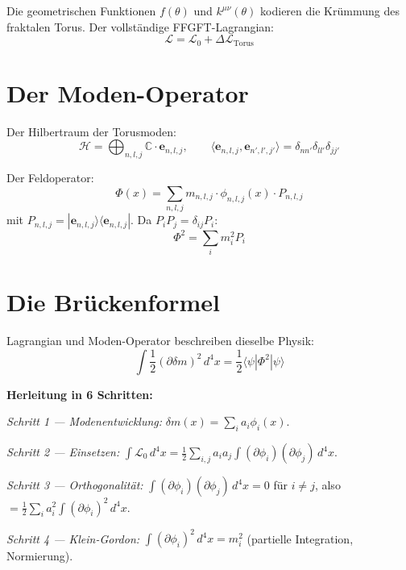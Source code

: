 Die geometrischen Funktionen $f(\theta)$ und $k^{\mu\nu}(\theta)$ kodieren
die Krümmung des fraktalen Torus. Der vollständige FFGFT-Lagrangian:
\begin{equation}
  \boxed{
    \mathcal{L} = \mathcal{L}_0 + \Delta\mathcal{L}_{\text{Torus}}
  }
\end{equation}

\section{Der Moden-Operator}

Der Hilbertraum der Torusmoden:
\begin{equation}
  \mathcal{H} = \bigoplus_{n,l,j} \mathbb{C}\cdot\mathbf{e}_{n,l,j},
  \qquad
  \langle\mathbf{e}_{n,l,j},\mathbf{e}_{n',l',j'}\rangle
  = \delta_{nn'}\delta_{ll'}\delta_{jj'}
\end{equation}

Der Feldoperator:
\begin{equation}
  \Phi(x) = \sum_{n,l,j} m_{n,l,j}\cdot\phi_{n,l,j}(x)\cdot P_{n,l,j}
\end{equation}
mit $P_{n,l,j} = |\mathbf{e}_{n,l,j}\rangle\langle\mathbf{e}_{n,l,j}|$.
Da $P_iP_j = \delta_{ij}P_i$:
\begin{equation}
  \Phi^2 = \sum_i m_i^2 P_i
\end{equation}

\section{Die Brückenformel}

Lagrangian und Moden-Operator beschreiben dieselbe Physik:
\begin{equation}
  \boxed{
    \int\frac{1}{2}(\partial\delta m)^2\,d^4x
    = \frac{1}{2}\langle\psi|\Phi^2|\psi\rangle
  }
  \label{eq:bruecke}
\end{equation}

\textbf{Herleitung in 6 Schritten:}

\textit{Schritt 1 — Modenentwicklung:}
$\delta m(x) = \sum_i a_i\phi_i(x)$.

\textit{Schritt 2 — Einsetzen:}
$\int\mathcal{L}_0\,d^4x
= \tfrac{1}{2}\sum_{i,j}a_ia_j\int(\partial\phi_i)(\partial\phi_j)\,d^4x$.

\textit{Schritt 3 — Orthogonalität:}
$\int(\partial\phi_i)(\partial\phi_j)\,d^4x = 0$ für $i\neq j$,
also $= \tfrac{1}{2}\sum_i a_i^2\int(\partial\phi_i)^2\,d^4x$.

\textit{Schritt 4 — Klein-Gordon:}
$\int(\partial\phi_i)^2\,d^4x = m_i^2$ (partielle Integration, Normierung).

